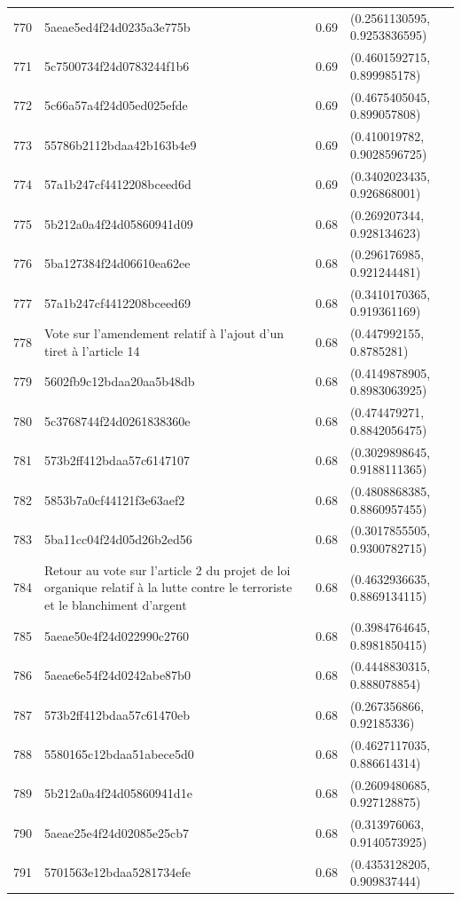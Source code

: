 \begin{table}[ht]
\begin{tabular}{rlrl}
  770 & 5aeae5ed4f24d0235a3e775b & 0.69 & (0.2561130595, 0.9253836595) \\ 
  771 & 5c7500734f24d0783244f1b6 & 0.69 & (0.4601592715, 0.899985178) \\ 
  772 & 5c66a57a4f24d05ed025efde & 0.69 & (0.4675405045, 0.899057808) \\ 
  773 & 55786b2112bdaa42b163b4e9 & 0.69 & (0.410019782, 0.9028596725) \\ 
  774 & 57a1b247cf4412208bceed6d & 0.69 & (0.3402023435, 0.926868001) \\ 
  775 & 5b212a0a4f24d05860941d09 & 0.68 & (0.269207344, 0.928134623) \\ 
  776 & 5ba127384f24d06610ea62ee & 0.68 & (0.296176985, 0.921244481) \\ 
  777 & 57a1b247cf4412208bceed69 & 0.68 & (0.3410170365, 0.919361169) \\ 
  778 & Vote sur l'amendement relatif à l'ajout d'un tiret à l'article 14 & 0.68 & (0.447992155, 0.8785281) \\ 
  779 & 5602fb9c12bdaa20aa5b48db & 0.68 & (0.4149878905, 0.8983063925) \\ 
  780 & 5c3768744f24d0261838360e & 0.68 & (0.474479271, 0.8842056475) \\ 
  781 & 573b2ff412bdaa57c6147107 & 0.68 & (0.3029898645, 0.9188111365) \\ 
  782 & 5853b7a0cf44121f3e63aef2 & 0.68 & (0.4808868385, 0.8860957455) \\ 
  783 & 5ba11cc04f24d05d26b2ed56 & 0.68 & (0.3017855505, 0.9300782715) \\ 
  784 & Retour au vote sur l'article 2 du projet de loi organique relatif à la lutte contre le terroriste et le blanchiment d'argent & 0.68 & (0.4632936635, 0.8869134115) \\ 
  785 & 5aeae50e4f24d022990c2760 & 0.68 & (0.3984764645, 0.8981850415) \\ 
  786 & 5aeae6e54f24d0242abe87b0 & 0.68 & (0.4448830315, 0.888078854) \\ 
  787 & 573b2ff412bdaa57c61470eb & 0.68 & (0.267356866, 0.92185336) \\ 
  788 & 5580165c12bdaa51abece5d0 & 0.68 & (0.4627117035, 0.886614314) \\ 
  789 & 5b212a0a4f24d05860941d1e & 0.68 & (0.2609480685, 0.927128875) \\ 
  790 & 5aeae25e4f24d02085e25cb7 & 0.68 & (0.313976063, 0.9140573925) \\ 
  791 & 5701563e12bdaa5281734efe & 0.68 & (0.4353128205, 0.909837444) \\ 

\end{tabular}
\end{table}
